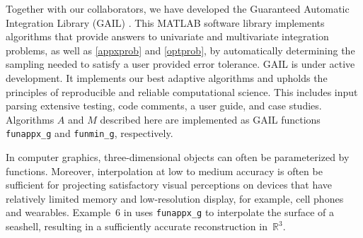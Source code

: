 \documentclass[review]{elsarticle}
\theoremstyle{definition}
\newcommand{\funappxg}{\texttt{funappx\_g}\xspace}
\newcommand{\funming}{\texttt{funmin\_g}\xspace}
\begin{document}
Together with our collaborators, we have developed the Guaranteed Automatic
Integration Library (GAIL) \cite{ChoEtal15a}. This MATLAB software library
implements algorithms that provide answers to univariate and multivariate
integration problems, as well as \eqref{appxprob} and \eqref{optprob}, by
automatically determining the sampling needed to satisfy a user provided error
tolerance. GAIL is under active development.  It implements our best adaptive algorithms and
upholds the principles of reproducible and reliable computational science.  This includes input parsing extensive testing, code comments, a user guide, and case studies.
Algorithms $A$ and $M$ described here are implemented as GAIL
functions \funappxg{} and \funming, respectively.

In computer graphics, three-dimensional objects can often be parameterized by
functions. Moreover, interpolation at low to medium accuracy is often be
sufficient for projecting satisfactory visual perceptions on devices that have
relatively limited memory and low-resolution display, for example, cell phones
and wearables. Example~6 in \cite[Chapter~3, Section~6]{Din15a} uses \funappxg{}
to interpolate the surface of a seashell, resulting in a sufficiently accurate
reconstruction in~$\mathbb{R}^3$.
\end{document}
